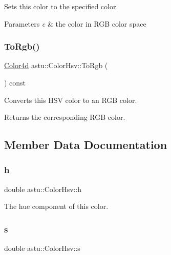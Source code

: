 Sets this color to the specified color.


\begin{DoxyParams}{Parameters}
{\em c} & the color in R\+GB color space \\
\hline
\end{DoxyParams}
\mbox{\label{classastu_1_1ColorHsv_a296b1f9beccd3c5b34d84f8b3fc83375}} 
\subsubsection{\texorpdfstring{To\+Rgb()}{ToRgb()}}
{\footnotesize\ttfamily \hyperlink{classastu_1_1Color}{Color4d} astu\+::\+Color\+Hsv\+::\+To\+Rgb (\begin{DoxyParamCaption}{ }\end{DoxyParamCaption}) const\hspace{0.3cm}{\ttfamily [inline]}}

Converts this H\+SV color to an R\+GB color.

\begin{DoxyReturn}{Returns}
the corresponding R\+GB color. 
\end{DoxyReturn}


\subsection{Member Data Documentation}
\mbox{\label{classastu_1_1ColorHsv_a4622776730a1656b8fa078d302243ec0}} 
\subsubsection{\texorpdfstring{h}{h}}
{\footnotesize\ttfamily double astu\+::\+Color\+Hsv\+::h}

The hue component of this color. \mbox{\label{classastu_1_1ColorHsv_a4935b897136129b2ec75bebd437d227e}} 
\subsubsection{\texorpdfstring{s}{s}}
{\footnotesize\ttfamily double astu\+::\+Color\+Hsv\+::s}

